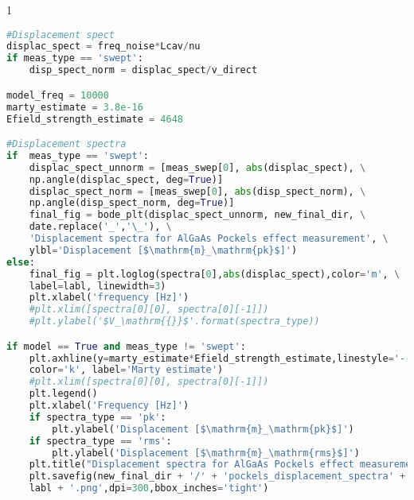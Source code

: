 \begin{spacing}{1} \begin{lstlisting}[frame=single, language=Python]
#Displacement spect
displac_spect = freq_noise*Lcav/nu                                           # Calibrate to displacement spectra
if meas_type == 'swept':
    disp_spect_norm = displac_spect/v_direct                                 # Displacement spectra normalized by the frequency dependent injection (leaves us with mpk/Vpk)

model_freq = 10000                                                           # Model estimate
marty_estimate = 3.8e-16                                                     # mpk/[V*m]
Efield_strength_estimate = 4648                                              # [V/m] (changed from 6350 to 4648 on 07-13-2021)

#Displacement spectra
if  meas_type == 'swept':                                                    # Organizing and plotting displacement spectra
    displac_spect_unnorm = [meas_swep[0], abs(displac_spect), \
    np.angle(displac_spect, deg=True)]
    displac_spect_norm = [meas_swep[0], abs(disp_spect_norm), \
    np.angle(disp_spect_norm, deg=True)]
    final_fig = bode_plt(displac_spect_unnorm, new_final_dir, \
    date.replace('_','\_'), \
    'Displacement spectra for AlGaAs Pockels effect measurement', \
    ylbl='Displacement [$\mathrm{m}_\mathrm{pk}$]')
else:
    final_fig = plt.loglog(spectra[0],abs(displac_spect),color='m', \
    label=labl, linewidth=3)
    plt.xlabel('frequency [Hz]')
    #plt.xlim([spectra[0][0], spectra[0][-1]])
    #plt.ylabel('$V_\mathrm{{}}$'.format(spectra_type))

if model == True and meas_type != 'swept':                                   # If model estimate is requested, will plot model estimate with data
    plt.axhline(y=marty_estimate*Efield_strength_estimate,linestyle='--', \
    color='k', label='Marty estimate')
    #plt.xlim([spectra[0][0], spectra[0][-1]])
    plt.legend()
    plt.xlabel('Frequency [Hz]')
    if spectra_type == 'pk':
        plt.ylabel('Displacement [$\mathrm{m}_\mathrm{pk}$]')
    if spectra_type == 'rms':
        plt.ylabel('Displacement [$\mathrm{m}_\mathrm{rms}$]')
    plt.title("Displacement spectra for AlGaAs Pockels effect measurement")
    plt.savefig(new_final_dir + '/' + 'pockels_displacement_spectra' + \
    labl + '.png',dpi=300,bbox_inches='tight')
\end{lstlisting} \end{spacing}

